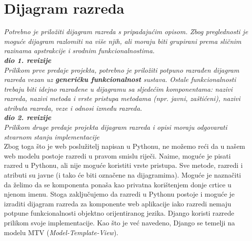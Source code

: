 			
		\section{Dijagram razreda}
		
			\textit{Potrebno je priložiti dijagram razreda s pripadajućim opisom. Zbog preglednosti je moguće dijagram razlomiti na više njih, ali moraju biti grupirani prema sličnim razinama apstrakcije i srodnim funkcionalnostima.}\\
			
			\textbf{\textit{dio 1. revizije}}\\
			
			\textit{Prilikom prve predaje projekta, potrebno je priložiti potpuno razrađen dijagram razreda vezan uz \textbf{generičku funkcionalnost} sustava. Ostale funkcionalnosti trebaju biti idejno razrađene u dijagramu sa sljedećim komponentama: nazivi razreda, nazivi metoda i vrste pristupa metodama (npr. javni, zaštićeni), nazivi atributa razreda, veze i odnosi između razreda.}\\
			
			\textbf{\textit{dio 2. revizije}}\\			
			
			\textit{Prilikom druge predaje projekta dijagram razreda i opisi moraju odgovarati stvarnom stanju implementacije} \\
			
			Zbog toga što je web poslužitelj napisan u Pythonu, ne možemo reći da u našem web modelu postoje razredi u pravom smislu riječi. Naime, moguće je pisati razred u Pythonu, ali nije moguće koristiti vrste pristupa. Sve metode, razredi i atributi su javne (i tako će biti označene na dijagramima). Moguće je naznačiti da želimo da se komponenta ponaša kao privatna korištenjem donje crtice u njenom imenu. Stoga zaključujemo da razredi u Pythonu postoje i moguće je izraditi dijagram razreda za komponente web aplikacije iako razredi nemaju potpune funkcionalnosti objektno orijentiranog jezika. Django koristi razrede prilikom svoje implementacije. Kao što je već navedeno, Django se temelji na modelu MTV (\emph{Model-Template-View}).\\\
			

